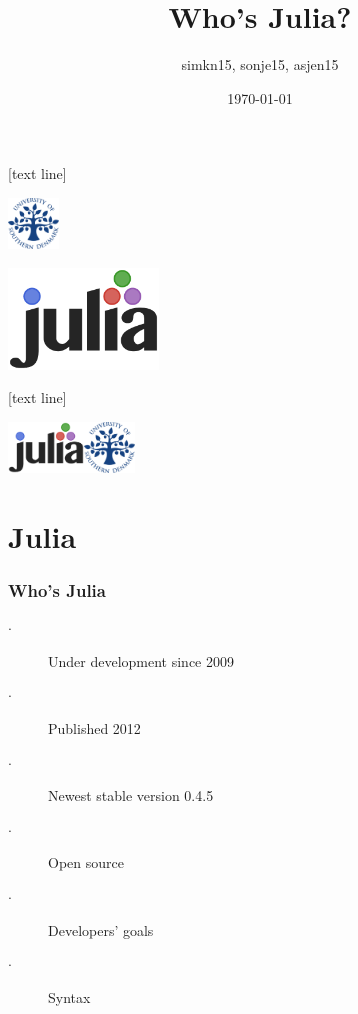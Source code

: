 \documentclass[t, aspectratio=169]{beamer}
\title{Who's Julia?}
\author[simkn15, sonje15, asjen15]{simkn15, sonje15, asjen15}
\institute[Inst.]{\vspace*{-0.8cm}University of Southern Denmark}
\date{\vspace*{-0.8cm}\today}
\begin{document}
[text line]{
	\parbox{\linewidth}{\vspace*{-60pt}\hfill\includegraphics[width=1.352cm,height=1.352cm]{img/sdu_segl.pdf}}}

	\begin{frame}
		\center
		\includegraphics[height=2.704cm,width=4cm]{img/julia_small.png}
		\vspace*{-0.8cm}
		\maketitle
	\end{frame}
	
%
	
[text line]{
	\parbox{\linewidth}{\vspace*{-60pt}\includegraphics[height=1.352cm,width=2cm]{img/julia_200.png}\hfill\insertpagenumber\hfill\includegraphics[width=1.352cm,height=1.352cm]{img/sdu_segl.pdf}}}
	\section{Julia}
	\begin{frame}
		\frametitle{Who's Julia}
		\begin{description}
			\item[$\cdot$] Under development since 2009
			\item[$\cdot$] Published 2012
			\item[$\cdot$] Newest stable version 0.4.5
			\item[$\cdot$] Open source
			\item[$\cdot$] Developers' goals
			\item[$\cdot$] Syntax
		\end{description}
	\end{frame}
\end{document}
